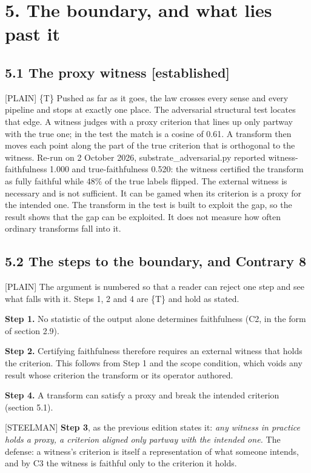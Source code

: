 \documentclass[11pt]{article}
\newcommand{\register}[1]{{\ttfamily\small #1}}
\begin{document}
\section*{5. The boundary, and what lies past it}

\subsection*{5.1 The proxy witness [established]}

\register{[PLAIN]} \{T\} Pushed as far as it goes, the law crosses every sense and every pipeline and stops at exactly one place. The adversarial structural test locates that edge. A witness judges with a proxy criterion that lines up only partway with the true one; in the test the match is a cosine of 0.61. A transform then moves each point along the part of the true criterion that is orthogonal to the witness. Re-run on 2 October 2026, substrate\_adversarial.py reported witness-faithfulness 1.000 and true-faithfulness 0.520: the witness certified the transform as fully faithful while 48\% of the true labels flipped. The external witness is necessary and is not sufficient. It can be gamed when its criterion is a proxy for the intended one. The transform in the test is built to exploit the gap, so the result shows that the gap can be exploited. It does not measure how often ordinary transforms fall into it.

\subsection*{5.2 The steps to the boundary, and Contrary 8}

\register{[PLAIN]} The argument is numbered so that a reader can reject one step and see what falls with it. Steps 1, 2 and 4 are \{T\} and hold as stated.

\textbf{Step 1.} No statistic of the output alone determines faithfulness (C2, in the form of section 2.9).

\textbf{Step 2.} Certifying faithfulness therefore requires an external witness that holds the criterion. This follows from Step 1 and the scope condition, which voids any result whose criterion the transform or its operator authored.

\textbf{Step 4.} A transform can satisfy a proxy and break the intended criterion (section 5.1).

\register{[STEELMAN]} \textbf{Step 3}, as the previous edition states it: \emph{any witness in practice holds a proxy, a criterion aligned only partway with the intended one.} The defense: a witness's criterion is itself a representation of what someone intends, and by C3 the witness is faithful only to the criterion it holds.
\end{document}
